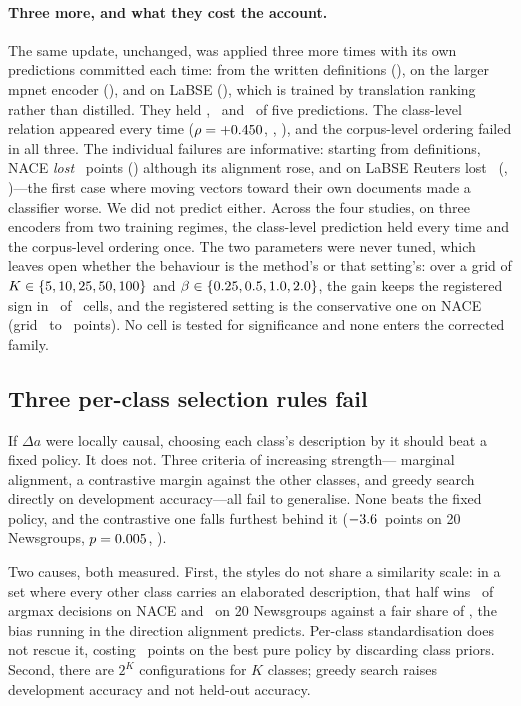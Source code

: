 \documentclass[11pt]{article}
\begin{document}
\paragraph{Three more, and what they cost the account.} The same update,
unchanged, was applied three more times with its own predictions committed each
time: from the written definitions (\RocchioDefRegistered), on the larger mpnet
encoder (\RocchioMpnetRegistered), and on LaBSE
(\RocchioLabseRegistered), which is trained by translation ranking rather than
distilled. They held \RocchioDefHeld, \RocchioMpnetHeld\ and
\RocchioLabseHeld\ of five predictions. The class-level relation appeared every
time ($\rho = +0.450$, \RocchioMpnetRho, \RocchioLabseRho), and the
corpus-level ordering failed in all three. The individual failures are
informative: starting from definitions, NACE \emph{lost}
\RocchioDefNaceGain~points (\RocchioDefNacePStat) although its alignment rose,
and on LaBSE Reuters lost \RocchioLabseReutersGain\
(\RocchioLabseReutersPStat, \HolmLabseReutersStat)---the first case where
moving vectors toward their own documents made a classifier worse. We did not
predict either. Across the four studies, on three encoders from two training
regimes, the class-level prediction held every time and the corpus-level
ordering once.
The two parameters were never tuned, which leaves open whether the behaviour is
the method's or that setting's: over a grid of $K \in \{5, 10, 25, 50, 100\}$ and
$\beta \in \{0.25, 0.5, 1.0, 2.0\}$, the gain keeps the registered sign in
\SweepAgreeing\ of \SweepCells\ cells, and the registered setting is the
conservative one on NACE (grid \SweepNaceMin\ to \SweepNaceMax~points). No
cell is tested for significance and none enters the corrected family.

\subsection{Three per-class selection rules fail}

If $\Delta a$ were locally causal, choosing each class's description by it should
beat a fixed policy. It does not. Three criteria of increasing strength---
marginal alignment, a contrastive margin against the other classes, and greedy
search directly on development accuracy---all fail to generalise. None beats
the fixed policy, and the contrastive one falls furthest behind it
($-3.6$~points on 20 Newsgroups,
$p = 0.005$, \HolmContrastiveStat).

Two causes, both measured. First, the styles do not share a similarity scale: in
a set where every other class carries an elaborated description, that half wins
\ElabShareNACE\ of argmax decisions on NACE and \ElabShareNews\ on 20 Newsgroups
against a fair share of \FairShare, the bias running in the direction alignment
predicts. Per-class standardisation does not rescue it, costing \ZScoreCost~points
on the best pure policy by discarding class priors. Second, there are $2^K$ configurations for $K$ classes;
greedy search raises development accuracy and not held-out accuracy.
\end{document}
